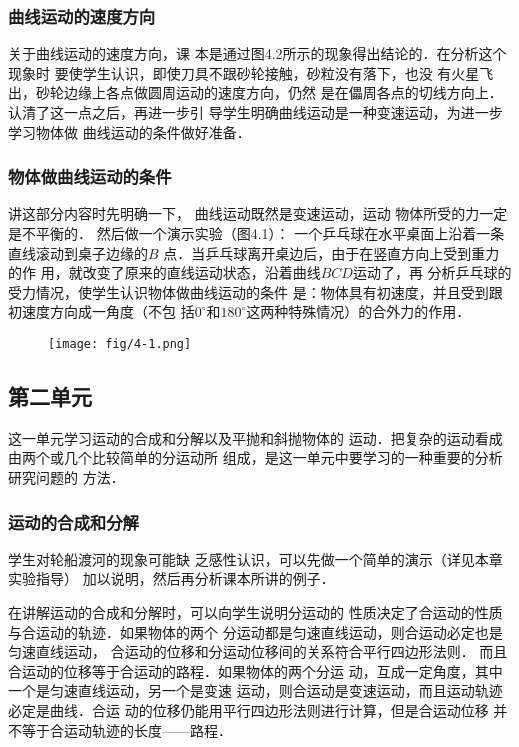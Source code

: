 \subsubsection{曲线运动的速度方向}

关于曲线运动的速度方向，课
本是通过图4.2所示的现象得出结论的．在分析这个现象时
要使学生认识，即使刀具不跟砂轮接触，砂粒没有落下，也没
有火星飞出，砂轮边缘上各点做圆周运动的速度方向，仍然
是在儡周各点的切线方向上．认清了这一点之后，再进一步引
导学生明确曲线运动是一种变速运动，为进一步学习物体做
曲线运动的条件做好准备．

\subsubsection{物体做曲线运动的条件}

讲这部分内容时先明确一下，
曲线运动既然是变速运动，运动
物体所受的力一定是不平衡的．
然后做一个演示实验（图4.1）：
一个乒乓球在水平桌面上沿着一条直线滚动到桌子边缘的$B$
点．当乒乓球离开桌边后，由于在竖直方向上受到重力的作
用，就改变了原来的直线运动状态，沿着曲线$BCD$运动了，再
分析乒乓球的受力情况，使学生认识物体做曲线运动的条件
是：物体具有初速度，并且受到跟初速度方向成一角度（不包
括$0^{\circ}$和$180^{\circ}$这两种特殊情况）的合外力的作用．

\begin{figure}[htp]
    \centering
\texttt{[image: fig/4-1.png]}
    \caption{}
\end{figure}

\subsection{第二单元}
这一单元学习运动的合成和分解以及平抛和斜抛物体的
运动．把复杂的运动看成由两个或几个比较简单的分运动所
组成，是这一单元中要学习的一种重要的分析研究问题的
方法．

\subsubsection{运动的合成和分解}

学生对轮船渡河的现象可能缺
乏感性认识，可以先做一个简单的演示（详见本章实验指导）
加以说明，然后再分析课本所讲的例子．

在讲解运动的合成和分解时，可以向学生说明分运动的
性质决定了合运动的性质与合运动的轨迹．如果物体的两个
分运动都是匀速直线运动，则合运动必定也是匀速直线运动，
合运动的位移和分运动位移间的关系符合平行四边形法则．
而且合运动的位移等于合运动的路程．如果物体的两个分运
动，互成一定角度，其中一个是匀速直线运动，另一个是变速
运动，则合运动是变速运动，而且运动轨迹必定是曲线．合运
动的位移仍能用平行四边形法则进行计算，但是合运动位移
并不等于合运动轨迹的长度——路程．

